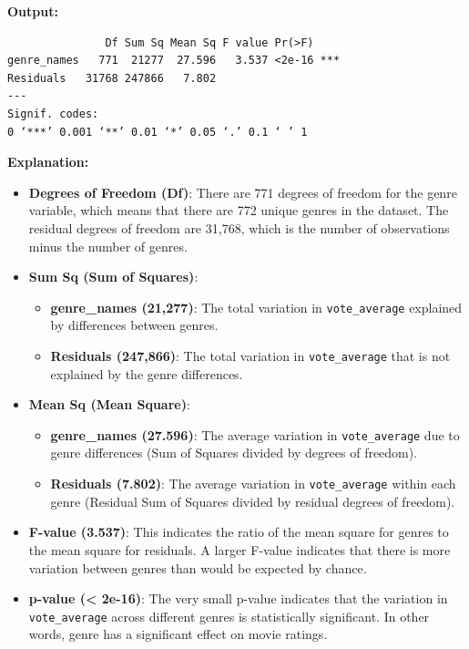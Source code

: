 \documentclass[
]{book}
\providecommand{\tightlist}{%
  \setlength{\itemsep}{0pt}\setlength{\parskip}{0pt}}
\begin{document}
\textbf{Output:}

\begin{verbatim}
               Df Sum Sq Mean Sq F value Pr(>F)    
genre_names   771  21277  27.596   3.537 <2e-16 ***
Residuals   31768 247866   7.802                   
---
Signif. codes:  
0 ‘***’ 0.001 ‘**’ 0.01 ‘*’ 0.05 ‘.’ 0.1 ‘ ’ 1
\end{verbatim}

\textbf{Explanation:}

\begin{itemize}
\item
  \textbf{Degrees of Freedom (Df)}: There are 771 degrees of freedom for the genre variable, which means that there are 772 unique genres in the dataset. The residual degrees of freedom are 31,768, which is the number of observations minus the number of genres.
\item
  \textbf{Sum Sq (Sum of Squares)}:

  \begin{itemize}
  \tightlist
  \item
    \textbf{genre\_names (21,277)}: The total variation in \texttt{vote\_average} explained by differences between genres.
  \item
    \textbf{Residuals (247,866)}: The total variation in \texttt{vote\_average} that is not explained by the genre differences.
  \end{itemize}
\item
  \textbf{Mean Sq (Mean Square)}:

  \begin{itemize}
  \tightlist
  \item
    \textbf{genre\_names (27.596)}: The average variation in \texttt{vote\_average} due to genre differences (Sum of Squares divided by degrees of freedom).
  \item
    \textbf{Residuals (7.802)}: The average variation in \texttt{vote\_average} within each genre (Residual Sum of Squares divided by residual degrees of freedom).
  \end{itemize}
\item
  \textbf{F-value (3.537)}: This indicates the ratio of the mean square for genres to the mean square for residuals. A larger F-value indicates that there is more variation between genres than would be expected by chance.
\item
  \textbf{p-value (\textless{} 2e-16)}: The very small p-value indicates that the variation in \texttt{vote\_average} across different genres is statistically significant. In other words, genre has a significant effect on movie ratings.
\end{itemize}
\end{document}
